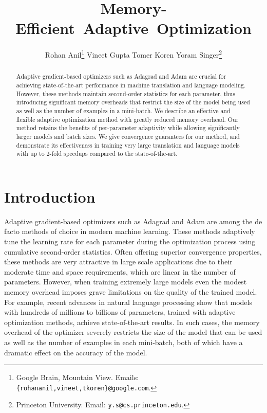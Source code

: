 \documentclass[a4paper,11pt]{article}
\title{\mbox{Memory-Efficient Adaptive Optimization}}
\author{Rohan Anil\thanks{Google Brain, Mountain View. Emails: \texttt{\{rohananil,vineet,tkoren\}@google\!.\!com}.}
\quad
Vineet Gupta\samethanks[1]
\quad
Tomer Koren\samethanks[1]
\quad
Yoram Singer\thanks{Princeton University. Email: \texttt{y.s@cs.princeton\!.\!edu}.}
}
\begin{document}
\maketitle

\begin{abstract}
Adaptive gradient-based optimizers such as Adagrad and Adam are crucial for
achieving state-of-the-art performance in machine translation and language
modeling. However, these methods maintain second-order statistics for each
parameter, thus introducing significant memory overheads that restrict the
size of the model being used as well as the number of examples in a
mini-batch. We describe an effective and flexible adaptive optimization method
with greatly reduced memory overhead. Our method retains the benefits of
per-parameter adaptivity while allowing significantly larger models and batch
sizes. We give convergence guarantees for our method, and demonstrate its
effectiveness in training very large translation and language models with up
to 2-fold speedups compared to the state-of-the-art.
\end{abstract}


\section{Introduction}

Adaptive gradient-based optimizers such as Adagrad \cite{duchi2011adaptive} and
Adam \cite{kingma2014adam} are among the de facto methods of choice in modern
machine learning. These methods adaptively tune the learning rate for each
parameter during the optimization process using cumulative second-order
statistics. Often offering superior convergence properties, these methods are
very attractive in large scale applications due to their moderate time and space
requirements, which are linear in the number of parameters.
However, when training extremely large models even the modest memory overhead
imposes grave limitations on the quality of the trained model. For example,
recent advances in natural language processing \cite{vaswani2017attention, gpt2}
show that models with hundreds of millions to billions of parameters, trained
with adaptive optimization methods, achieve state-of-the-art results. In such
cases, the memory overhead of the optimizer severely restricts the size of the
model that can be used as well as the number of examples in each mini-batch,
both of which have a dramatic effect on the accuracy of the model.
\end{document}
